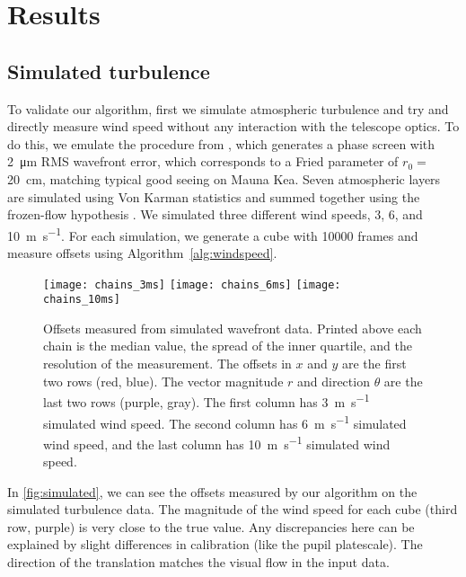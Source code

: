 \section{Results}\label{sec:results}
\subsection{Simulated turbulence}\label{sec:simulated}

To validate our algorithm, first we simulate atmospheric turbulence and try and directly measure wind speed without any interaction with the telescope optics. To do this, we emulate the procedure from \citet[sec.~4.1]{guyon_adaptive_2017}, which generates a phase screen with \SI{2}{\micro\meter} RMS wavefront error, which corresponds to a Fried parameter of $r_0=$\SI{20}{\centi\meter}, matching typical good seeing on Mauna Kea. Seven atmospheric layers are simulated using Von Karman statistics and summed together using the frozen-flow hypothesis \citep[see][tbl.~1]{guyon_adaptive_2017}. We simulated three different wind speeds, 3, 6, and \SI{10}{\meter\per\second}. For each simulation, we generate a cube with \num{10000} frames and measure offsets using Algorithm~\autoref{alg:windspeed}.

\begin{figure}
    \centering
    \texttt{[image: chains\_3ms]}
    \texttt{[image: chains\_6ms]}
    \texttt{[image: chains\_10ms]}
    \caption{Offsets measured from simulated wavefront data. Printed above each chain is the median value, the spread of the inner quartile, and the resolution of the measurement. The offsets in $x$ and $y$ are the first two rows (red, blue). The vector magnitude $r$ and direction $\theta$ are the last two rows (purple, gray). The first column has \SI{3}{\meter\per\second} simulated wind speed. The second column has \SI{6}{\meter\per\second} simulated wind speed, and the last column has \SI{10}{\meter\per\second} simulated wind speed.}
    \label{fig:simulated}
\end{figure}

In \autoref{fig:simulated}, we can see the offsets measured by our algorithm on the simulated turbulence data. The magnitude of the wind speed for each cube (third row, purple) is very close to the true value. Any discrepancies here can be explained by slight differences in calibration (like the pupil platescale). The direction of the translation matches the visual flow in the input data.


